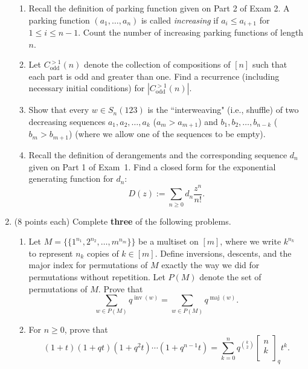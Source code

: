 \documentclass[11pt]{article}
\theoremstyle{definition}
\DeclareMathOperator{\inv}{inv}
\DeclareMathOperator{\maj}{maj}
\newcommand{\qbinom}[2]{
  \displaystyle \left[\begin{matrix}#1  \\#2  \\ \end{matrix}\right]}
\begin{document}
\begin{enumerate}
\begin{enumerate}

\item Recall the definition of parking function given on Part 2 of Exam 2.  A parking function $(a_1,\ldots,a_n)$ is called \emph{increasing} if $a_i\leq a_{i+1}$ for $1\leq i\leq n-1$. Count the number of increasing parking functions of length $n$.

\item Let $C^{>1}_{\text{odd}}(n)$ denote the collection of compositions of $[n]$  such that each part is odd and greater than one. Find a recurrence (including necessary initial conditions) for $|C^{>1}_{\text{odd}}(n)|$.

\item Show that every $w\in S_n(123)$ is the ``interweaving" (i.e., shuffle) of two decreasing sequences $a_1,a_2,\ldots, a_k$ ($a_m>a_{m+1}$) and $b_1,b_2,\ldots,b_{n-k}$ ($b_m>b_{m+1}$) (where we allow one of the sequences to be empty).

\item Recall the definition of derangements and the corresponding sequence $d_n$ given on Part 1 of Exam~1. Find a closed form for the exponential generating function for $d_n$:
\[
D(z):=\sum_{n\geq 0}d_n\frac{z^n}{n!}.
\]

\end{enumerate}

\item (8 points each) Complete \textbf{three} of the following problems.

\begin{enumerate}

\item Let $M= \{\{1^{n_1},2^{n_2},\ldots,m^{n_m}\}\}$ be a multiset on $[m]$, where we write $k^{n_k}$ to represent $n_k$ copies of $k\in[m]$. Define inversions, descents, and the major index for permutations of $M$ exactly the way we did for permutations without repetition. Let $P(M)$ denote the set of permutations of $M$. Prove that
\[
\sum_{w\in P(M)}q^{\inv(w)}=\sum_{w\in P(M)}q^{\maj(w)}.
\]


\item For $n\geq 0$, prove that
\[
(1+t)(1+qt)(1+q^2t)\cdots (1+q^{n-1}t)=\sum_{k=0}^nq^{\binom{k}{2}}\qbinom{n}{k}_qt^k.
\]


\end{enumerate}
\end{enumerate}
\end{document}
